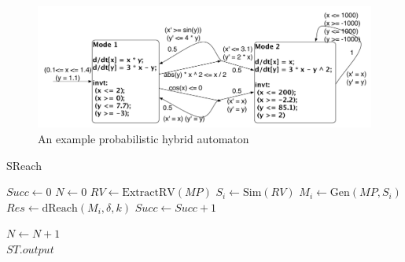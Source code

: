 \begin{figure}
\centering
\includegraphics[width=\linewidth]{examplepha}
\caption{An example probabilistic hybrid automaton}
\label{fig:examplepha}
\end{figure}


\begin{algorithm}
  \centering
  \caption{SReach}
  \label{fig:sreach}
  \begin{algorithmic}[1]
        \State $Succ \gets 0$	
        \State $N \gets 0$	
        \State $RV \gets \mathrm{ExtractRV}(MP)$	
        \Repeat
            \State $S_i \gets \mathrm{Sim}(RV)$		
            \State $M_i \gets \mathrm{Gen}(MP, S_i)$	
            \State $Res \gets \mathrm{dReach}(M_i, \delta, k)$	
		\State $Succ \gets Succ + 1$
	    
	  \EndIf
	\State $N \gets N + 1$
        	\\
	\quad\hspace{0.5ex} \Return $ST.output$
   \EndFunction
  \end{algorithmic}
\end{algorithm}

